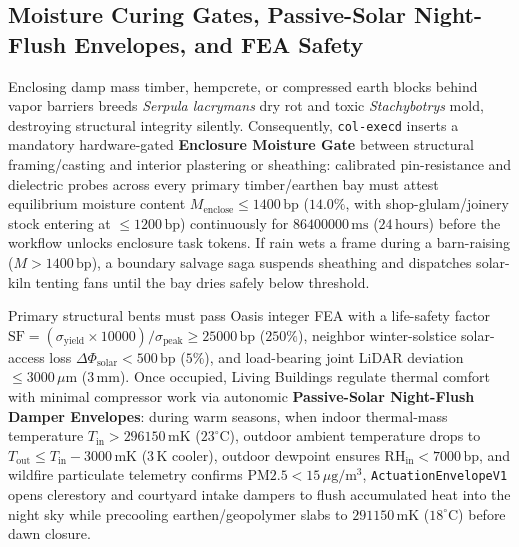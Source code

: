 \subsection{Moisture Curing Gates, Passive-Solar Night-Flush Envelopes, and FEA Safety}

Enclosing damp mass timber, hempcrete, or compressed earth blocks behind vapor barriers breeds \emph{Serpula lacrymans} dry rot and toxic
\emph{Stachybotrys} mold, destroying structural integrity silently. Consequently, \texttt{col-execd} inserts a mandatory hardware-gated
\textbf{Enclosure Moisture Gate} between structural framing/casting and interior plastering or sheathing: calibrated pin-resistance and
dielectric probes across every primary timber/earthen bay must attest equilibrium moisture content $M_{\mathrm{enclose}} \le 1400\,\mathrm{bp}$
($14.0\%$, with shop-glulam/joinery stock entering at $\le 1200\,\mathrm{bp}$) continuously for $86400000\,\mathrm{ms}$ ($24\,\mathrm{hours}$)
before the workflow unlocks enclosure task tokens. If rain wets a frame during a barn-raising ($M > 1400\,\mathrm{bp}$), a boundary salvage saga
suspends sheathing and dispatches solar-kiln tenting fans until the bay dries safely below threshold.

Primary structural bents must pass Oasis integer FEA with a life-safety factor
$\mathrm{SF} = (\sigma_{\mathrm{yield}} \times 10000) / \sigma_{\mathrm{peak}} \ge 25000\,\mathrm{bp}$ ($250\%$), neighbor winter-solstice
solar-access loss $\Delta \Phi_{\mathrm{solar}} < 500\,\mathrm{bp}$ ($5\%$), and load-bearing joint LiDAR deviation $\le 3000\,\mu\mathrm{m}$
($3\,\mathrm{mm}$). Once occupied, Living Buildings regulate thermal comfort with minimal compressor work via autonomic \textbf{Passive-Solar
Night-Flush Damper Envelopes}: during warm seasons, when indoor thermal-mass temperature $T_{\mathrm{in}} > 296150\,\mathrm{mK}$
($23^\circ\mathrm{C}$), outdoor ambient temperature drops to $T_{\mathrm{out}} \le T_{\mathrm{in}} - 3000\,\mathrm{mK}$ ($3\,\mathrm{K}$ cooler),
outdoor dewpoint ensures $\mathrm{RH}_{\mathrm{in}} < 7000\,\mathrm{bp}$, and wildfire particulate telemetry confirms
$\mathrm{PM2.5} < 15\,\mu\mathrm{g/m^3}$, \texttt{ActuationEnvelopeV1} opens clerestory and courtyard intake dampers to flush accumulated heat
into the night sky while precooling earthen/geopolymer slabs to $291150\,\mathrm{mK}$ ($18^\circ\mathrm{C}$) before dawn closure.

